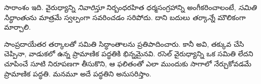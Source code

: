 \documentclass[../../../include/open-logic-section]{subfiles}
\begin{document}
సారాంశం ఇది. వైరుధ్యాన్ని
\emph{నివారిస్తూ} నిర్బంధరహిత
ధర్మసంగ్రహాన్ని అంగీకరించాలంటే,
\emph{సమితి సిద్ధాంతం}ను
మాత్రమే స్వల్పంగా సవరించడం
సరిపోదు. దాని బదులు
\emph{తర్కాన్నే} మౌలికంగా మార్చాలి.

సాంప్రదాయేతర తర్కాలతో
సమితి సిద్ధాంతాలను
ప్రతిపాదించారు. కానీ అవి,
తక్కువ చేసి చెప్పినా, వాడుకలో ఉన్న ప్రామాణిక పద్ధతికి భిన్నమైనవి.
రసెల్ వైరుధ్యాన్ని ఒక సమితి లేదని చూపించే సూటి నిరూపణగా
తీసుకొని, ఆ ఫలితంతో ఎలా ముందుకు సాగాలో నేర్చుకోవడమే
ప్రామాణిక పద్ధతి. మనమూ
అదే పద్ధతిని అనుసరిస్తాం.
\end{document}

